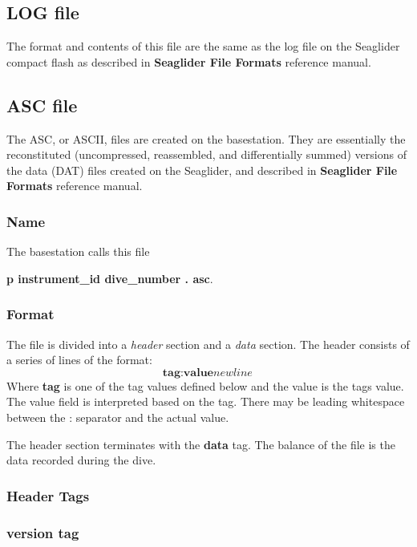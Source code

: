 \documentclass[12pt,english,twoside]{book}
\begin{document}
\subsection{LOG file}

The format and contents of this file are the same as the log file on the
Seaglider compact flash as described in \textbf{Seaglider File Formats}
reference manual.


\subsection{ASC file}

The ASC, or ASCII, files are created on the basestation. They are essentially
the reconstituted (uncompressed, reassembled, and differentially summed)
versions of the data (DAT) files created on the Seaglider, and described in
\textbf{Seaglider File Formats} reference manual.


\subsubsection{Name}

The basestation calls this file

\textbf{p instrument\_id dive\_number . asc}.


\subsubsection{Format}

The file is divided into a \textit{header} section and a \textit{data}
section. The header consists of a series of lines of the format: \[
\textbf{tag}:\textbf{value}\textit{newline}\]
 Where \textbf{tag} is one of the tag values defined below and the
value is the tags value. The value field is interpreted based on the
tag. There may be leading whitespace between the : separator and the
actual value.

The header section terminates with the \textbf{data} tag. The balance
of the file is the data recorded during the dive.


\subsubsection{Header Tags}


\subsubsection{version tag}
\end{document}
